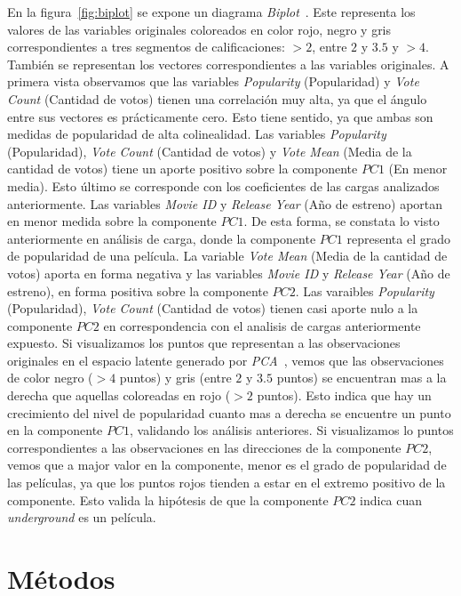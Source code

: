 \documentclass[11pt,a4paper,twoside]{thesis}
\begin{document}
En la figura~\ref{fig:biplot} se expone un diagrama
\textit{Biplot}~\cite{biplot}. Este representa los valores de las variables
originales coloreados en color rojo, negro y gris correspondientes a tres
segmentos de calificaciones: $>2$, entre $2$ y $3.5$ y $>4$. También se
representan los vectores correspondientes a las variables originales. A primera
vista observamos que las variables \textit{Popularity} (Popularidad) y
\textit{Vote Count} (Cantidad de votos) tienen una correlación muy alta, ya que
el ángulo entre sus vectores es prácticamente cero. Esto tiene sentido, ya que
ambas son medidas de popularidad de alta colinealidad. Las variables
\textit{Popularity} (Popularidad), \textit{Vote Count} (Cantidad de votos) y
\textit{Vote Mean} (Media de la cantidad de votos) tiene un aporte positivo
sobre la componente $PC1$ (En menor media). Esto último se corresponde con los
coeficientes de las cargas analizados anteriormente. Las variables
\textit{Movie ID} y \textit{Release Year} (Año de estreno) aportan en menor
medida sobre la componente $PC1$. De esta forma, se constata lo visto
anteriormente en análisis de carga, donde la componente $PC1$ representa el
grado de popularidad de una película. La variable \textit{Vote Mean} (Media de
la cantidad de votos) aporta en forma negativa y las variables \textit{Movie ID
} y \textit{Release Year} (Año de estreno), en forma positiva sobre la
componente $PC2$. Las varaibles \textit{Popularity} (Popularidad), \textit{Vote
	Count} (Cantidad de votos) tienen casi aporte nulo a la componente $PC2$ en
correspondencia con el analisis de cargas anteriormente expuesto. Si
visualizamos los puntos que representan a las observaciones originales en el
espacio latente generado por \textit{PCA}~\cite{pca}, vemos que las
observaciones de color negro ($>4$ puntos) y gris (entre $2$ y $3.5$ puntos) se
encuentran mas a la derecha que aquellas coloreadas en rojo ($>2$ puntos). Esto
indica que hay un crecimiento del nivel de popularidad cuanto mas a derecha se
encuentre un punto en la componente $PC1$, validando los análisis anteriores.
Si visualizamos lo puntos correspondientes a las observaciones en las
direcciones de la componente $PC2$, vemos que a major valor en la componente,
menor es el grado de popularidad de las películas, ya que los puntos rojos
tienden a estar en el extremo positivo de la componente. Esto valida la
hipótesis de que la componente $PC2$ indica cuan \textit{underground} es un
película.

\chapter{Métodos}
\end{document}
